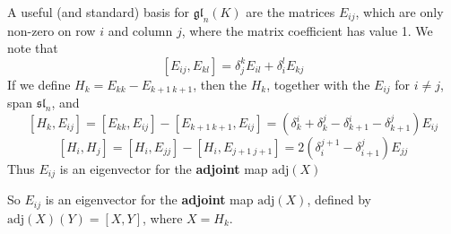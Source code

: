 A useful (and standard) basis for $\mathfrak{gl}_n(K)$ are the matrices $E_{ij}$, which are only non-zero on row $i$ and column $j$, where the matrix coefficient has value 1. We note that
%
\[ [E_{ij}, E_{kl}] = \delta_j^k E_{il} + \delta_i^l E_{kj} \]
%
If we define $H_k = E_{kk} - E_{k+1\ k+1}$, then the $H_k$, together with the $E_{ij}$ for $i \neq j$, span $\mathfrak{sl}_n$, and
%
\[ [H_k, E_{ij}] = [E_{kk}, E_{ij}] - [E_{k+1\ k+1}, E_{ij}] = (\delta_k^i + \delta_k^j - \delta_{k+1}^i - \delta_{k+1}^j) E_{ij} \]
%
\[ [H_i, H_j] = [H_i, E_{jj}] - [H_i, E_{j+1\ j+1}] = 2(\delta_i^{j+1} - \delta_{i+1}^j) E_{jj} \]
%
Thus $E_{ij}$ is an eigenvector for the {\bf adjoint} map $\text{adj}(X)$

So $E_{ij}$ is an eigenvector for the {\bf adjoint} map $\text{adj}(X)$, defined by $\text{adj}(X)(Y) = [X,Y]$, where $X = H_k$.